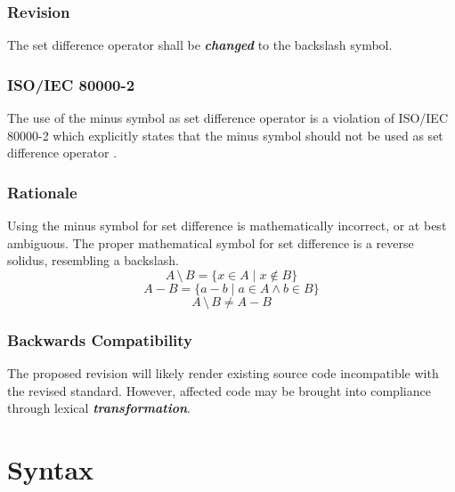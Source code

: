 \documentclass[10pt,a4paper,leqno,fleqn]{article}
\renewcommand{\emph}[1]{\textbf{\textit{#1}}}
\begin{document}
\subsubsection{Revision}
The set difference operator shall be \emph{changed} to the backslash symbol.

\subsubsection{ISO/IEC 80000-2}
The use of the minus symbol as set difference operator is a violation of
ISO/IEC 80000-2 which explicitly states that the minus symbol
should not be used as set difference operator \cite{II2019}.

\subsubsection{Rationale}
Using the minus symbol for set difference is mathematically incorrect, or at best
ambiguous. The proper mathematical symbol for set difference is a reverse
solidus, resembling a backslash.
\begin{equation}
A \, \setminus \, B = \{ x \in A \mid x \notin B \}
\end{equation}
\begin{equation}
A-B = \{ a-b \mid a \in A \land b \in B \}
\end{equation}
\abovedisplayshortskip=4pt
\belowdisplayshortskip=10pt
\begin{equation}
A \, \setminus \, B \neq A-B
\end{equation}
\abovedisplayshortskip=0pt
\belowdisplayshortskip=0pt


\subsubsection{Backwards Compatibility}

The proposed revision will likely render existing source code incompatible with
the revised standard. However, affected code may be brought into compliance
through lexical \emph{transformation}.


\section{Syntax}

\end{document}
